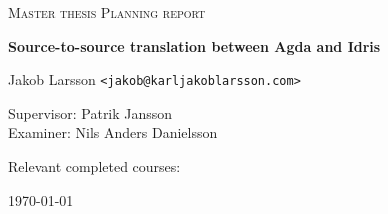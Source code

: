 \documentclass{scrartcl}
\begin{document}
\begin{titlepage}

\centering
{\scshape\LARGE Master thesis Planning report}

\vspace{0.5cm}
{\huge\bfseries Source-to-source translation between Agda and Idris
  }

\vspace{2cm}
{\Large Jakob Larsson \texttt{<jakob@karljakoblarsson.com>}}

\vspace{1.0cm}
{\large Supervisor: Patrik Jansson  \\
        Examiner: Nils Anders Danielsson}

\vspace{1.5cm}
{\large Relevant completed courses:}

\vfill
{\large \today}

\end{titlepage}

%
%

%
\end{document}
